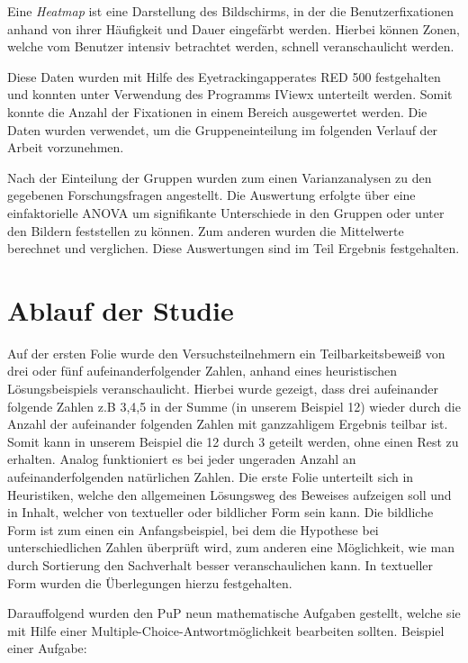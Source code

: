 Eine \textit{Heatmap} ist eine Darstellung des Bildschirms, in der die Benutzerfixationen anhand von ihrer Häufigkeit und Dauer eingefärbt werden. Hierbei können Zonen, welche vom Benutzer intensiv betrachtet werden, schnell veranschaulicht werden.

Diese Daten wurden mit Hilfe des Eyetrackingapperates RED 500 festgehalten und konnten unter Verwendung des Programms IViewx unterteilt werden. Somit konnte die Anzahl der Fixationen in einem Bereich ausgewertet werden. Die Daten wurden verwendet, um die Gruppeneinteilung im folgenden Verlauf der Arbeit vorzunehmen.

Nach der Einteilung der Gruppen wurden zum einen Varianzanalysen zu den gegebenen Forschungsfragen angestellt. Die Auswertung erfolgte über eine einfaktorielle ANOVA um signifikante Unterschiede in den Gruppen oder unter den Bildern feststellen zu können. Zum anderen wurden die Mittelwerte berechnet und verglichen. Diese Auswertungen sind im Teil Ergebnis festgehalten.

\section{Ablauf der Studie}

Auf der ersten Folie wurde den Versuchsteilnehmern ein Teilbarkeitsbeweiß von drei oder fünf aufeinanderfolgender Zahlen, anhand eines heuristischen Lösungsbeispiels veranschaulicht. Hierbei wurde gezeigt, dass drei aufeinander folgende Zahlen z.B 3,4,5 in der Summe (in unserem Beispiel 12) wieder durch die Anzahl der aufeinander folgenden Zahlen mit ganzzahligem Ergebnis teilbar ist. Somit kann in unserem Beispiel die 12 durch 3 geteilt werden, ohne einen Rest zu erhalten.
Analog funktioniert es bei jeder ungeraden Anzahl an aufeinanderfolgenden natürlichen Zahlen. Die erste Folie unterteilt sich in Heuristiken, welche den allgemeinen Lösungsweg des Beweises aufzeigen soll und in Inhalt, welcher von textueller oder bildlicher Form sein kann. Die bildliche Form ist zum einen ein Anfangsbeispiel, bei dem die Hypothese bei unterschiedlichen Zahlen überprüft wird, zum anderen eine Möglichkeit, wie man durch Sortierung den Sachverhalt besser veranschaulichen kann. In textueller Form wurden die Überlegungen hierzu festgehalten.

Darauffolgend wurden den \gls{PuP} neun mathematische Aufgaben gestellt, welche sie mit Hilfe einer Multiple-Choice-Antwortmöglichkeit bearbeiten sollten. Beispiel einer Aufgabe:

